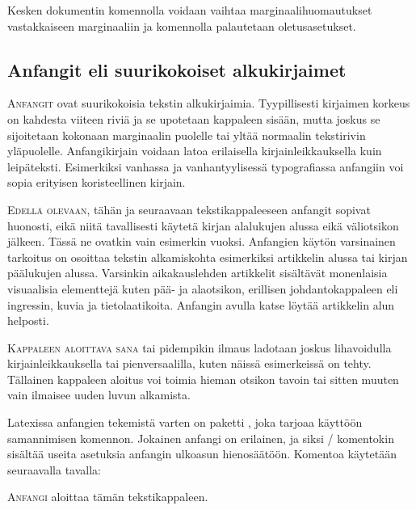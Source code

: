 \noindent
Kesken dokumentin komennolla  voidaan vaihtaa
marginaalihuomautukset vastakkaiseen marginaaliin ja komennolla
 palautetaan oletusasetukset.

\subsection{Anfangit eli suurikokoiset alkukirjaimet}

\lettrine[lines=3, loversize=.06, lhang=.02, findent=-5bp, nindent=4bp,
slope=4bp]{A}{nfangit} ovat suurikokoisia tekstin alkukirjaimia.
Tyypillisesti kirjaimen korkeus on kahdesta viiteen riviä ja se
upotetaan kappaleen sisään, mutta joskus se sijoitetaan kokonaan
marginaalin puolelle tai yltää normaalin tekstirivin yläpuolelle.
Anfangikirjain voidaan latoa erilaisella kirjainleikkauksella kuin
leipäteksti. Esimerkiksi vanhassa ja vanhantyylisessä typografiassa
anfangiin voi sopia erityisen koristeellinen kirjain.

\smallskip

\lettrine[lines=2, lhang=1, nindent=0bp]{E\hspace{1.5bp}}{dellä
  olevaan}, tähän ja seuraavaan tekstikappaleeseen anfangit sopivat
huonosti, eikä niitä tavallisesti käytetä kirjan alalukujen alussa eikä
väliotsikon jälkeen. Tässä ne ovatkin vain esimerkin vuoksi. Anfangien
käytön varsinainen tarkoitus on osoittaa tekstin alkamiskohta
esimerkiksi artikkelin alussa tai kirjan päälukujen alussa. Varsinkin
aikakauslehden artikkelit sisältävät monenlaisia visuaalisia elementtejä
kuten pää- ja alaotsikon, erillisen johdantokappaleen eli ingressin,
kuvia ja tietolaatikoita. Anfangin avulla katse löytää artikkelin alun
helposti.

\lettrine[lines=1, loversize=.1, lhang=.02, findent=1.5bp]{K}{appaleen
  aloittava sana} tai pidempikin ilmaus ladotaan joskus lihavoidulla
kirjainleikkauksella tai pienversaalilla, kuten näissä esimerkeissä on
tehty. Tällainen kappaleen aloitus voi toimia hieman otsikon tavoin tai
sitten muuten vain ilmaisee uuden luvun alkamista.

Latexissa anfangien tekemistä varten on paketti ,
joka tarjoaa käyttöön samannimisen komennon. Jokainen anfangi on
erilainen, ja siksi \-/ komentokin sisältää useita
asetuksia anfangin ulkoasun hienosäätöön. Komentoa käytetään seuraavalla
tavalla:

\begin{koodilohkosis}
\lettrine[lines=3, loversize=.06, lhang=.02, findent=-5bp,
  nindent=4bp, slope=4bp]{A}{nfangi} aloittaa tämän tekstikappaleen.
\end{koodilohkosis}


